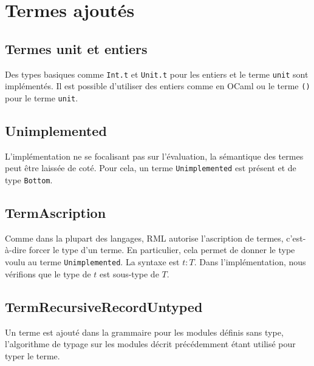 \section{Termes ajoutés}

\subsection*{Termes unit et entiers}

Des types basiques comme \verb|Int.t| et \verb|Unit.t| pour les entiers et le terme
\verb|unit| sont implémentés. Il est possible d'utiliser des entiers comme en
OCaml ou le terme \verb|()| pour le terme \verb|unit|.

\subsection*{Unimplemented}

L'implémentation ne se focalisant pas sur l'évaluation, la sémantique des termes
peut être laissée de coté. Pour cela, un terme \verb|Unimplemented| est présent
et de type \verb|Bottom|.

\subsection*{TermAscription}

Comme dans la plupart des langages, RML autorise l'ascription de termes,
c'est-à-dire forcer le type d'un terme. En particulier, cela permet de donner le
type voulu au terme \verb|Unimplemented|. La syntaxe est $t : T$. Dans
l'implémentation, nous vérifions que le type de $t$ est sous-type de $T$.

\subsection*{TermRecursiveRecordUntyped}

Un terme est ajouté dans la grammaire pour les modules définis sans type,
l'algorithme de typage sur les modules décrit précédemment étant utilisé pour
typer le terme.


%
%
%

